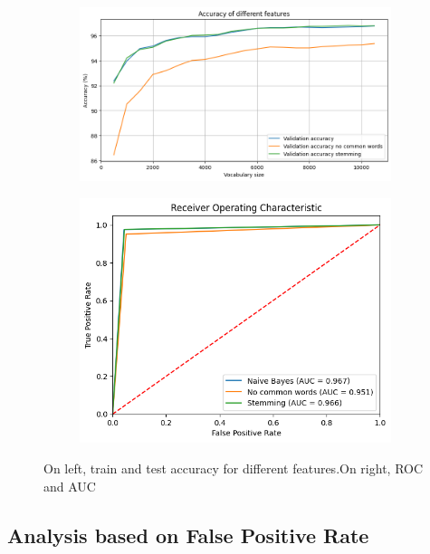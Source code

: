 \documentclass{class}
\begin{document}
\begin{figure}[h]
    \begin{subfigure}{.5\linewidth}
        \includegraphics[width=\linewidth]{images/naive_features_sel.png}
    \end{subfigure}%
    \begin{subfigure}{.5\linewidth}
        \includegraphics[width=\linewidth]{images/naive_features_sel_ROC.png}
    \end{subfigure}
    \caption{On left, train and test accuracy for different features.On right, ROC and AUC}
    \label{fig-2}
\end{figure}
\subsection{Analysis based on False Positive Rate}
\end{document}
